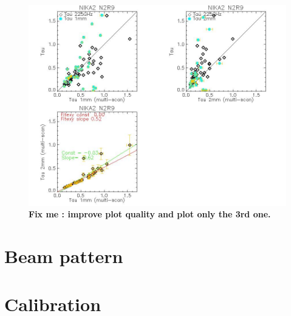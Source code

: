 \documentclass[a4paper, 11pt]{article} %
\begin{document}

\begin{figure}
\begin{center}
\includegraphics[clip, angle=0, scale = 0.5]{Figures/test_allskd_N2R9.jpg}
\caption{{\bf Fix me : improve plot quality and plot only the 3rd one.}}
\label{fig:test_allskd_N2R9}
\end{center}
\end{figure}

\section{Beam pattern}




\section{Calibration}
\end{document}
